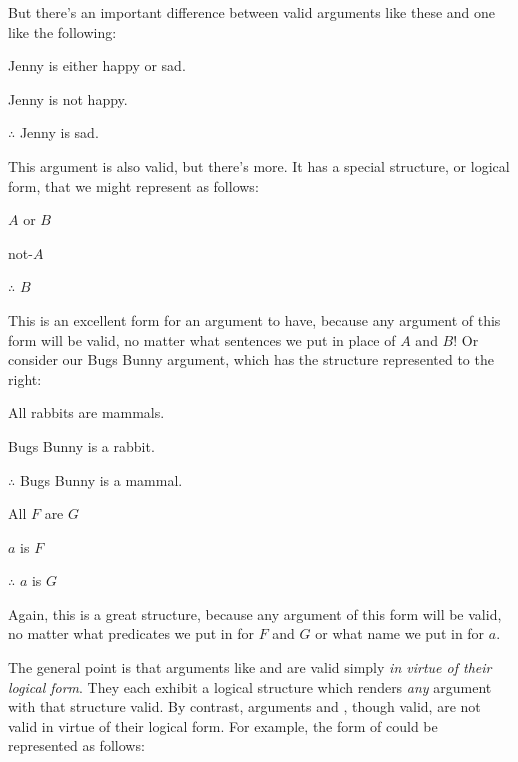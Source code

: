 But there's an important difference between valid arguments like these and one like the following:

	\begin{earg}
		\item[\ex{exarg8}] Jenny is either happy or sad.
		\item[] Jenny is not happy.
		\item[] $\therefore$ Jenny is sad.
	\end{earg}

\noindent This argument is also valid, but there's more.  It has a special structure, or logical form, that we might represent as follows:


	\begin{earg}
		\item[] $A$ or $B$
		\item[] not-$A$
		\item[] $\therefore$ $B$
	\end{earg}

\noindent This is an excellent form for an argument to have, because any argument of this form will be valid, no matter what sentences we put in place of $A$ and $B$! Or consider our Bugs Bunny argument, which has the structure represented to the right:



\begin{multicols}{2}
	
\begin{earg}
\item[\eref{exarg1}]All rabbits are mammals.
\item[] Bugs Bunny is a rabbit.
\item[] $\therefore$ Bugs Bunny is a mammal.
\end{earg}
	
\columnbreak

\begin{earg}
	\item[] All $F$ are $G$
	\item[] $a$ is $F$
	\item[] $\therefore$ $a$ is $G$
\end{earg}

\end{multicols}


\noindent Again, this is a great structure, because any argument of this form will be valid, no matter what predicates we put in for $F$ and $G$ or what name we put in for $a$.


The general point is that arguments like  and   are valid simply \emph{in virtue of their logical form}.  They each exhibit a logical structure which renders \emph{any} argument with that structure valid.  By contrast, arguments   and , though valid, are not valid in virtue of their logical form.  For example, the form of  could be represented as follows:

